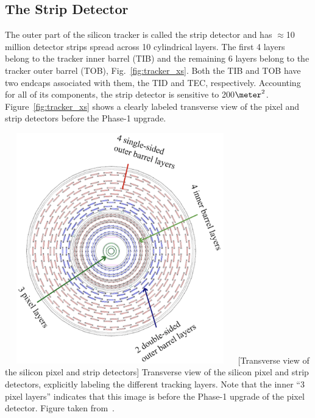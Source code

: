 \subsection{The Strip Detector}
\label{sec:strip}
The outer part of the silicon tracker is called the strip detector and has $\approx$10 million detector strips spread across 10 cylindrical layers.
The first 4 layers belong to the tracker inner barrel (TIB) and the remaining 6 layers belong to the tracker outer barrel (TOB), Fig.~\ref{fig:tracker_xs}. 
Both the TIB and TOB have two endcaps associated with them, the TID and TEC, respectively.
Accounting for all of its components, the strip detector is sensitive to 200$\meter^2$.
Figure~\ref{fig:tracker_xs} shows a clearly labeled transverse view of the pixel and strip detectors before the Phase-1 upgrade.
\begin{multiFigure}
    \centering
    \includegraphics[width=10cm,height=10cm,keepaspectratio]{figures/cms/tracker/silicon_tracker_transverse_view.png}
        [Transverse view of the silicon pixel and strip detectors]
        {Transverse view of the silicon pixel and strip detectors, explicitly labeling the different tracking layers.
        Note that the inner ``3 pixel layers'' indicates that this image is before the Phase-1 upgrade of the pixel detector.
        Figure taken from~\cite{strip_detector_xs}.}
    \label{fig:tracker_xs}
\end{multiFigure}
